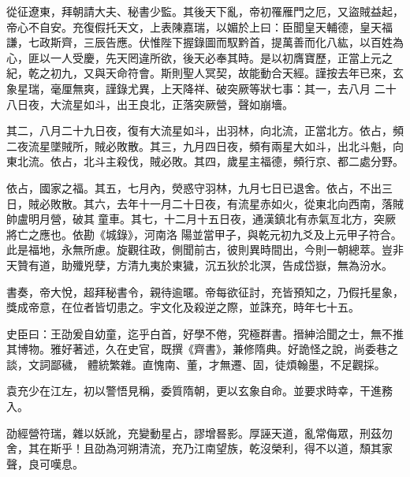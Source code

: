 \begin{pinyinscope}
 從征遼東，拜朝請大夫、秘書少監。其後天下亂，帝初罹雁門之厄，又盜賊益起，帝心不自安。充復假托天文，上表陳嘉瑞，以媚於上曰：臣聞皇天輔德，皇天福謙，七政斯齊，三辰告應。伏惟陛下握錄圖而馭黔首，提萬善而化八紘，以百姓為心，匪以一人受慶，先天罔違所欲，後天必奉其時。是以初膺寶歷，正當上元之紀，乾之初九，又與天命符會。斯則聖人冥契，故能動合天經。謹按去年已來，玄象星瑞，毫厘無爽，謹錄尤異，上天降祥、破突厥等狀七事：其一，去八月
 二十八日夜，大流星如斗，出王良北，正落突厥營，聲如崩墻。



 其二，八月二十九日夜，復有大流星如斗，出羽林，向北流，正當北方。依占，頻二夜流星墜賊所，賊必敗散。其三，九月四日夜，頻有兩星大如斗，出北斗魁，向東北流。依占，北斗主殺伐，賊必敗。其四，歲星主福德，頻行京、都二處分野。



 依占，國家之福。其五，七月內，熒惑守羽林，九月七日已退舍。依占，不出三日，賊必敗散。其六，去年十一月二十日夜，有流星赤如火，從東北向西南，落賊帥盧明月營，破其童車。其七，十二月十五日夜，通漢鎮北有赤氣亙北方，突厥將亡之應也。依勘《城錄》，河南洛
 陽並當甲子，與乾元初九爻及上元甲子符合。此是福地，永無所慮。旋觀往政，側聞前古，彼則異時間出，今則一朝總萃。豈非天贊有道，助殲兇孽，方清九夷於東獩，沉五狄於北溟，告成岱嶽，無為汾水。



 書奏，帝大悅，超拜秘書令，親待逾暱。帝每欲征討，充皆預知之，乃假托星象，獎成帝意，在位者皆切患之。宇文化及殺逆之際，並誅充，時年七十五。



 史臣曰：王劭爰自幼童，迄乎白首，好學不倦，究極群書。搢紳洽聞之士，無不推其博物。雅好著述，久在史官，既撰《齊書》，兼修隋典。好詭怪之說，尚委巷之談，文詞鄙穢，
 體統繁雜。直愧南、董，才無遷、固，徒煩翰墨，不足觀採。



 袁充少在江左，初以警悟見稱，委質隋朝，更以玄象自命。並要求時幸，干進務入。



 劭經營符瑞，雜以妖訛，充變動星占，謬增晷影。厚誣天道，亂常侮眾，刑茲勿舍，其在斯乎！且劭為河朔清流，充乃江南望族，乾沒榮利，得不以道，頹其家聲，良可嘆息。



\end{pinyinscope}
